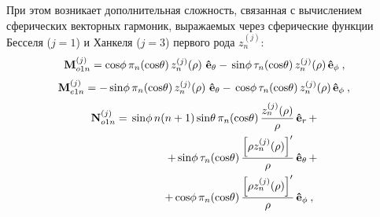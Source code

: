 При этом возникает дополнительная сложность, связанная с вычислением
сферических векторных гармоник, выражаемых через сферические функции
Бесселя ($j=1$) и Ханкеля ($j=3$) первого рода $z_n^{(j)}$:
\begin{equation}
  \label{eq:2p1}
 \begin{alignedat}{2}
  {\rm\mathbf{M}}_{o1n}^{(j)} ={\rm cos} \phi\,
         \pi_n\!\left({\rm  cos} \theta\right)
         z_n^{(j)}\!\left( \rho \right)\,
         {\boldsymbol{\hat{\rm e}}}_{\theta}   
-\,{\rm sin} \phi\,
         \tau_n\!\left({\rm  cos} \theta\right)
         z_n^{(j)}\!\left( \rho \right)\,
         &{\boldsymbol{\hat{\rm e}}}_{\phi}\:,
 \end{alignedat}
\end{equation}
%
\begin{equation}
 \begin{alignedat}{2}
  {\rm\mathbf{M}}_{e1n}^{(j)} =-\,{\rm sin} \phi\,
         \pi_n\!\left({\rm  cos} \theta\right)
         z_n^{(j)}\!\left( \rho \right)\,
         {\boldsymbol{\hat{\rm e}}}_{\theta}   
-\, {\rm cos} \phi\,
         \tau_n\!\left({\rm  cos} \theta\right)
         z_n^{(j)}\!\left( \rho \right)\,
         &{\boldsymbol{\hat{\rm e}}}_{\phi}\:,
 \end{alignedat}
\end{equation}
%
\begin{equation}
 \begin{alignedat}{2}
{\rm \mathbf{N}}_{o1n}^{(j)} = \,{\rm sin} \phi\,n\!\left(n+1\right)
         {\rm sin}\theta\,
         \pi_n\!\left({\rm  cos} \theta\right)
         \frac{
               z_n^{(j)}\!\left( \rho \right)
              }{\rho}\,
           &{\boldsymbol{\hat{\rm e}}}_{r}\,+   \\
+\,
{\rm sin} \phi\,
         \tau_n\!\left({\rm  cos} \theta\right)
         \frac{
            \left[\rho z_n^{(j)}\!\left( \rho \right)\right]^{\prime}
              }{\rho}\,
            &{\boldsymbol{\hat{\rm e}}}_{\theta}\,+   \\
+\,
{\rm cos} \phi\,
         \pi_n\!\left({\rm  cos} \theta\right)
         \frac{
            \left[\rho z_n^{(j)}\!\left( \rho \right)\right]^{\prime}
              }{\rho}\,
            &{\boldsymbol{\hat{\rm e}}}_{\phi}\:,
\end{alignedat}
\end{equation}
%
